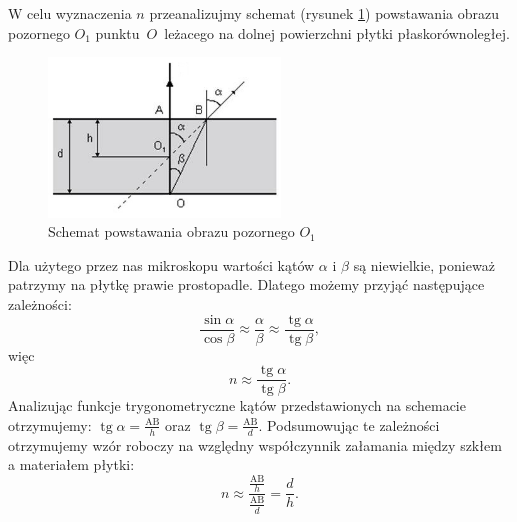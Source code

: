\documentclass [a4paper,11pt]{article}
\DeclareMathOperator{\tg}{tg}
\begin{document}
	W celu wyznaczenia $n$ przeanalizujmy schemat (rysunek \ref{fig:schemat}) powstawania obrazu pozornego $O_1$ punktu~$O$~leżacego na dolnej powierzchni płytki płaskorównoległej. 
	
	\begin{figure}[!h]
		\begin{center}
			\includegraphics[width=0.55\textwidth]{schemat_zalamanie}
			\caption{Schemat powstawania obrazu pozornego $O_1$ }
			\label{fig:schemat}
		\end{center}
	\end{figure}
	
	Dla użytego przez nas mikroskopu wartości kątów $\alpha$ i $\beta$ są niewielkie, ponieważ patrzymy na płytkę prawie prostopadle. Dlatego możemy przyjąć następujące zależności:
	\begin{equation}
		\frac{\sin \alpha}{\cos \beta}\approx\frac{ \alpha}{ \beta}\approx\frac{\tg \alpha}{\tg \beta},
	\end{equation}
	więc
	\begin{equation}
		n\approx\frac{\tg \alpha}{\tg \beta}.
	\end{equation}
	Analizując funkcje trygonometryczne kątów przedstawionych na schemacie otrzymujemy:
	$\tg \alpha = \frac{\text{AB}}{h}$ oraz $\tg \beta = \frac{\text{AB}}{d}$.
	Podsumowując te zależności otrzymujemy wzór roboczy na względny współczynnik załamania między szkłem a materiałem płytki:
	\begin{equation}
	\label{eq:roboczy}
		n\approx\frac{\frac{\text{AB}}{h}}{\frac{\text{AB}}{d}}=\frac{d}{h}.
	\end{equation} 
		
\end{document}
